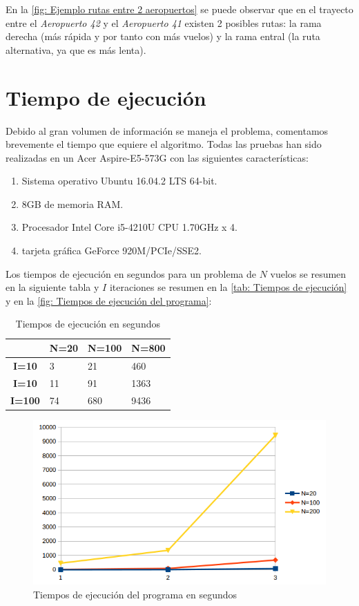 En la \autoref{fig: Ejemplo rutas entre 2 aeropuertos} se puede observar que en el trayecto entre el \textit{Aeropuerto 42} y el \textit{Aeropuerto 41} existen 2 posibles rutas: la rama derecha (más rápida y por tanto con más vuelos) y la rama entral (la ruta alternativa, ya que es más lenta).

\section{Tiempo de ejecución}
Debido al gran volumen de información se maneja el problema, comentamos brevemente el tiempo que equiere el algoritmo. Todas las pruebas han sido realizadas en un Acer Aspire-E5-573G con las siguientes características:
\begin{enumerate}
	\item Sistema operativo Ubuntu 16.04.2 LTS 64-bit.
	\item 8GB de memoria RAM.
	\item Procesador Intel Core i5-4210U CPU 1.70GHz x 4.
	\item tarjeta gráfica GeForce 920M/PCIe/SSE2.
\end{enumerate}

Los tiempos de ejecución en segundos para un problema de $N$ vuelos se resumen en la siguiente tabla y $I$ iteraciones se resumen en la \autoref{tab: Tiempos de ejecución} y en la \autoref{fig: Tiempos de ejecución del programa}:

\begin{table}[h]
	\centering
	\caption{Tiempos de ejecución en segundos }
	\label{tab: Tiempos de ejecución}
	\begin{tabular}{c|l|l|l|}
		\cline{2-4}
		& \multicolumn{1}{c|}{\textbf{N=20}} & \multicolumn{1}{c|}{\textbf{N=100}} & \multicolumn{1}{c|}{\textbf{N=800}} \\ \hline
		\multicolumn{1}{|c|}{\textbf{I=10}} &3  &21  &460  \\ \hline
		\multicolumn{1}{|c|}{\textbf{I=10}} &11  &91  &1363  \\ \hline
		\multicolumn{1}{|c|}{\textbf{I=100}} &74  &680  &9436  \\ \hline
	\end{tabular}
\end{table}


\begin{figure}[]
	\begin{center}
		\centering
		\includegraphics[width=1\textwidth]{./imagenes/resultados/tiemposejecucion.png}
		\caption{Tiempos de ejecución del programa en segundos}
		\label{fig: Tiempos de ejecución del programa}
	\end{center}
\end{figure}
